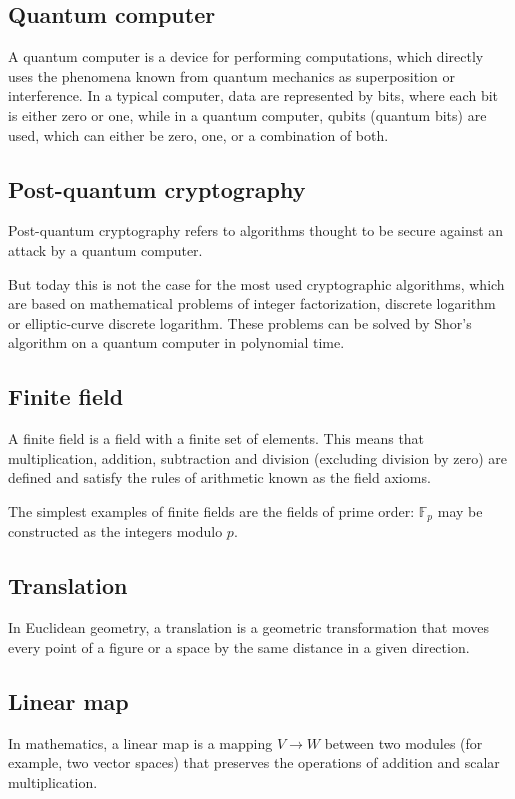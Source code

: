 \documentclass[thesis=M,english]{FITthesis}[2019/12/23]
\begin{document}
\subsection{Quantum computer}
A quantum computer is a device for performing computations, which directly uses the phenomena known from quantum mechanics as superposition or interference. In a typical computer, data are represented by bits, where each bit is either zero or one, while in a quantum computer, qubits (quantum bits) are used, which can either be zero, one, or a combination of both.

\subsection{Post-quantum cryptography}
Post-quantum cryptography refers to algorithms thought to be secure against an attack by a quantum computer.

But today this is not the case for the most used cryptographic algorithms, which are based on mathematical problems of integer factorization, discrete logarithm or elliptic-curve discrete logarithm. These problems can be solved by Shor's algorithm on a quantum computer in polynomial time.

\subsection{Finite field}
A finite field is a field with a finite set of elements. This means that multiplication, addition, subtraction and division (excluding division by zero) are defined and satisfy the rules of arithmetic known as the field axioms.

The simplest examples of finite fields are the fields of prime order: $\mathbb {F}_{p}$ may be constructed as the integers modulo $p$.

\subsection{Translation}
In Euclidean geometry, a translation is a geometric transformation that moves every point of a figure or a space by the same distance in a given direction.

\subsection{Linear map}
In mathematics, a linear map is a mapping $V \rightarrow W$ between two modules (for example, two vector spaces) that preserves the operations of addition and scalar multiplication.
\end{document}
